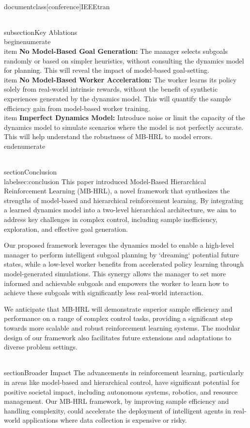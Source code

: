 \\documentclass[conference]{IEEEtran}
\begin{document}
\\subsection{Key Ablations}
\\begin{enumerate}
    \\item \textbf{No Model-Based Goal Generation:} The manager selects subgoals randomly or based on simpler heuristics, without consulting the dynamics model for planning. This will reveal the impact of model-based goal-setting.
    \\item \textbf{No Model-Based Worker Acceleration:} The worker learns its policy solely from real-world intrinsic rewards, without the benefit of synthetic experiences generated by the dynamics model. This will quantify the sample efficiency gain from model-based worker training.
    \\item \textbf{Imperfect Dynamics Model:} Introduce noise or limit the capacity of the dynamics model to simulate scenarios where the model is not perfectly accurate. This will help understand the robustness of MB-HRL to model errors.
\\end{enumerate}

\\section{Conclusion} \\label{sec:conclusion}
This paper introduced Model-Based Hierarchical Reinforcement Learning (MB-HRL), a novel framework that synthesizes the strengths of model-based and hierarchical reinforcement learning. By integrating a learned dynamics model into a two-level hierarchical architecture, we aim to address key challenges in complex control, including sample inefficiency, exploration, and effective goal generation.

Our proposed framework leverages the dynamics model to enable a high-level manager to perform intelligent subgoal planning by `dreaming` potential future states, while a low-level worker benefits from accelerated policy learning through model-generated simulations. This synergy allows the manager to set more informed and achievable subgoals and empowers the worker to learn how to achieve these subgoals with significantly less real-world interaction.

We anticipate that MB-HRL will demonstrate superior sample efficiency and performance on a range of complex control tasks, providing a significant step towards more scalable and robust reinforcement learning systems. The modular design of our framework also facilitates future extensions and adaptations to diverse problem settings.

\\section{Broader Impact}
The advancements in reinforcement learning, particularly in areas like model-based and hierarchical control, have significant potential for positive societal impact, including autonomous systems, robotics, and resource management. Our MB-HRL framework, by improving sample efficiency and handling complexity, could accelerate the deployment of intelligent agents in real-world applications where data collection is expensive or risky.
\end{document}
